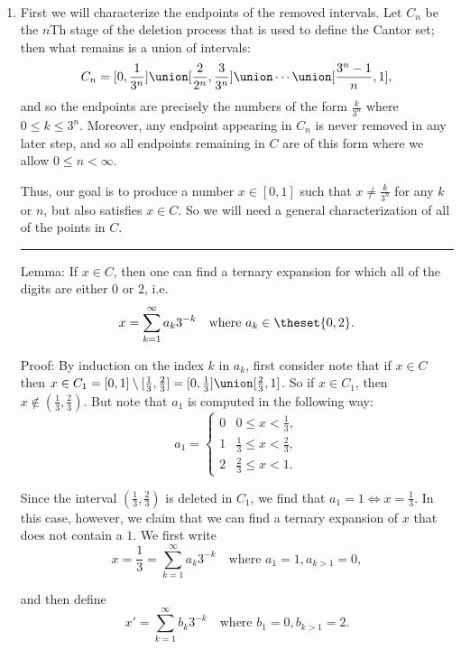 \begin{solution}\hfill\\
  \begin{enumerate}
    \item First we will characterize the endpoints of the removed intervals. Let $C_n$ be the $n$Th stage of the deletion process that is used to define the Cantor set; then what remains is a union of intervals:
      $$
      C_n = [0, \frac 1 {3^n}] \union [\frac 2 {2^n}, \frac 3 {3^n}] \union \cdots \union[\frac {3^n-1} n, 1],
      $$
    and so the endpoints are precisely the numbers of the form $\frac{k}{3^n}$ where $0 \leq k \leq 3^n$. Moreover, any endpoint appearing in $C_n$ is never removed in any later step, and so all endpoints remaining in $C$ are of this form where we allow $0\leq n < \infty$.

    Thus, our goal is to produce a number $x\in [0,1]$ such that $x \neq \frac k {3^n}$ for any $k$ or $n$, but also satisfies $x\in C$. So we will need a general characterization of all of the points in $C$.

    \vspace{1em}\hrule

    Lemma: If $x\in C$, then one can find a ternary expansion for which all of the digits are either $0$ or $2$, i.e.
    $$
    x = \sum_{k=1}^\infty a_k 3^{-k} \quad \text{where } a_k \in \theset{0, 2}.
    $$

    Proof: By induction on the index $k$ in $a_k$, first consider note that if $x\in C$ then $x \in C_1 = [0, 1] \setminus [\frac 1 3, \frac 2 3]= [0, \frac 1 3] \union [\frac 2 3, 1]$. So if $x\in C_1$, then $x\not\in(\frac 1 3, \frac 2 3)$. But note that $a_1$ is computed in the following way:
    $$
    a_1 = \begin{cases}
      0 & 0 \leq x < \frac 1 3, \\
      1 & \frac 1 3 \leq x < \frac 2 3, \\
      2 & \frac 2 3 \leq x < 1.
    \end{cases}
    $$

    Since the interval $(\frac 1 3, \frac 2 3)$ is deleted in $C_1$, we find that $a_1 = 1 \iff x = \frac 1 3$. In this case, however, we claim that we can find a ternary expansion of $x$ that does not contain a $1$.  We first write
    $$
    x = \frac 1 3 = \sum_{k=1}^\infty a_k 3^{-k} \quad \text{where } a_1 = 1, a_{k>1} = 0,
    $$

    and then define
    $$
    x' = \sum_{k=1}^\infty b_k 3^{-k} \quad\text{where } b_1 = 0, b_{k>1} = 2.
    $$


\end{enumerate}
\end{solution}
